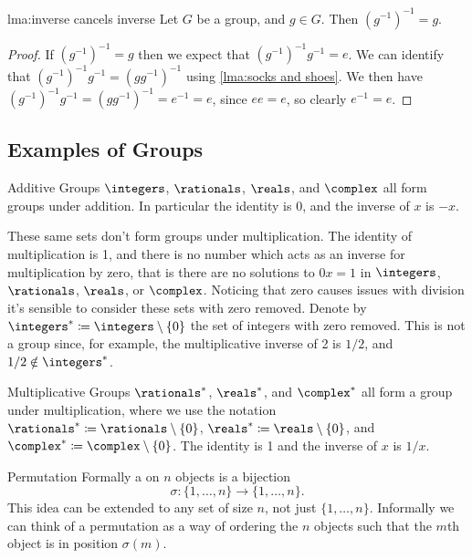 \documentclass[fleqn]{NotesClass}
\begin{document}
    \begin{lma}{}{lma:inverse cancels inverse}
        Let \(G\) be a group, and \(g \in G\).
        Then \((g^{-1})^{-1} = g\).
        \begin{proof}
            If \((g^{-1})^{-1} = g\) then we expect that \((g^{-1})^{-1}g^{-1} = e\).
            We can identify that \((g^{-1})^{-1}g^{-1} = (gg^{-1})^{-1}\) using \cref{lma:socks and shoes}.
            We then have \((g^{-1})^{-1}g^{-1} = (gg^{-1})^{-1} = e^{-1} = e\), since \(ee = e\), so clearly \(e^{-1} = e\).
        \end{proof}
    \end{lma}
    
    \subsection{Examples of Groups}
    \begin{exm}{Additive Groups}{}
        \(\integers\), \(\rationals\), \(\reals\), and \(\complex\) all form groups under addition.
        In particular the identity is \(0\), and the inverse of \(x\) is \(-x\).
    \end{exm}
    
    These same sets don't form groups under multiplication.
    The identity of multiplication is 1, and there is no number which acts as an inverse for multiplication by zero, that is there are no solutions to \(0x = 1\) in \(\integers\), \(\rationals\), \(\reals\), or \(\complex\).
    Noticing that zero causes issues with division it's sensible to consider these sets with zero removed.
    Denote by \(\integers^* \coloneqq \integers \setminus \{0\}\) the set of integers with zero removed.
    This is not a group since, for example, the multiplicative inverse of 2 is \(1/2\), and \(1/2 \notin \integers^*\).
    
    \begin{exm}{Multiplicative Groups}{}
        \(\rationals^*\), \(\reals^*\), and \(\complex^*\) all form a group under multiplication, where we use the notation \(\rationals^* \coloneqq \rationals \setminus \{0\}\), \(\reals^* \coloneqq \reals \setminus \{0\}\), and \(\complex^* \coloneqq \complex \setminus \{0\}\).
        The identity is 1 and the inverse of \(x\) is \(1/x\).
    \end{exm}
    
    \begin{dfn}{Permutation}{}
        Formally a  on \(n\) objects is a bijection
        \begin{equation}
            \sigma \colon \{1, \dotsc, n\} \to \{1, \dotsc, n\}.
        \end{equation}
        This idea can be extended to any set of size \(n\), not just \(\{1, \dotsc, n\}\).
        Informally we can think of a permutation as a way of ordering the \(n\) objects such that the \(m\)th object is in position \(\sigma(m)\).
    \end{dfn}
    
\end{document}

